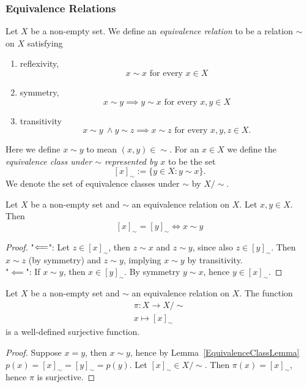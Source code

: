 \subsubsection{Equivalence Relations}
\begin{definition}
    Let $X$ be a non-empty set. We define an \textit{equivalence relation} to be a relation $\sim$ on $X$ satisfying 
    \begin{enumerate}
        \item reflexivity,
        $$x\sim x \text{ for every } x \in X$$
        \item symmetry,
        $$x \sim y \implies y\sim x \text{ for every } x,y\in X$$
        \item transitivity
        $$x \sim y\ \wedge y\sim z \implies x\sim z \text{ for every } x,y,z\in X.$$
    \end{enumerate}
    Here we define $x\sim y$ to mean $(x,y)\in \sim$. For an $x\in X$ we define the \textit{equivalence class under $\sim$ represented by $x$} to be the set 
    $$[x]_\sim:= \{y\in X : y\sim x\}.$$
    We denote the set of equivalence classes under $\sim$ by $X/\sim$.
\end{definition}
\begin{lemma}\label{EquivalenceClassLemma}
    Let $X$ be a non-empty set and $\sim$ an equivalence relation on $X$. Let $x,y\in X$. Then 
    $$[x]_\sim = [y]_\sim \iff x\sim y$$
\end{lemma}
\begin{proof}
    "$\Longleftarrow$": Let $z\in [x]_\sim$, then $z\sim x$ and $z\sim y$, since also $z\in [y]_\sim$. Then $x\sim z$ (by symmetry) and $z\sim y$, implying $x\sim y$ by transitivity.\\
    "$\impliedby$": If $x\sim y$, then $x\in [y]_\sim$. By symmetry $y\sim x$, hence $y\in [x]_\sim$. 
\end{proof}
\begin{lemma}\label{CanonicalSurjection}
    Let $X$ be a non-empty set and $\sim$ an equivalence relation on $X$. The function
    \begin{gather*}
        \pi : X\rightarrow X/\sim\\
        x\mapsto [x]_\sim
    \end{gather*}
    is a well-defined surjective function.
\end{lemma}
\begin{proof}
    Suppose $x=y$, then $x\sim y$, hence by Lemma~\ref{EquivalenceClassLemma} $p(x)=[x]_\sim=[y]_\sim=p(y)$. Let $[x]_\sim \in X/\sim$. Then $\pi(x) =[x]_\sim$, hence $\pi$ is surjective.
\end{proof}
